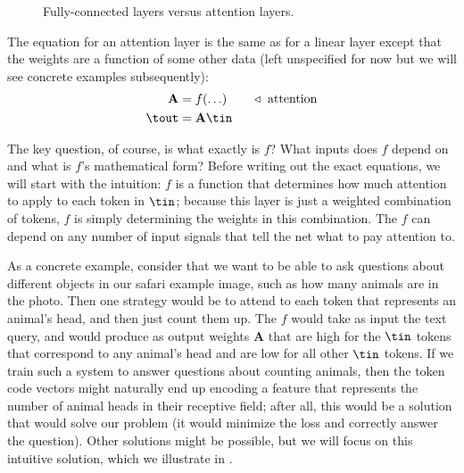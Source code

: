 \begin{figure}[h]
{\begin{minipage}{.24\linewidth}
        \end{minipage}
    }
    \caption{Fully-connected layers versus attention layers.}
    \label{fig:transformers:fc_vs_attn}
\end{figure}

The equation for an attention layer is the same as for a linear layer except that the weights are a function of some other data (left unspecified for now but we will see concrete examples subsequently):
\begin{align}
    \mathbf{A} & = f(\ldots) \quad\quad \triangleleft \text{ attention} \\
    \tout      & = \mathbf{A}\tin
\end{align}

The key question, of course, is what exactly is $f$? What inputs does $f$ depend on and what is $f$'s mathematical form? Before writing out the exact equations, we will start with the intuition: $f$ is a function that determines how much attention to apply to each token in $\tin$; because this layer is just a weighted combination of tokens, $f$ is simply determining the weights in this combination. The $f$ can depend on any number of input signals that tell the net what to pay attention to.%

As a concrete example, consider that we want to be able to ask questions about different objects in our safari example image, such as how many animals are in the photo. Then one strategy would be to attend to each token that represents an animal's head, and then just count them up. The $f$ would take as input the text query, and would produce as output weights $\mathbf{A}$ that are high for the $\tin$ tokens that correspond to any animal's head and are low for all other $\tin$ tokens. If we train such a system to answer questions about counting animals, then the token code vectors might naturally end up encoding a feature that represents the number of animal heads in their receptive field; after all, this would be a solution that would solve our problem (it would minimize the loss and correctly answer the question). Other solutions might be possible, but we will focus on this intuitive solution, which we illustrate in \fig{\ref{fig:transformers:attention_layer_safari_query_cartoon}}.

